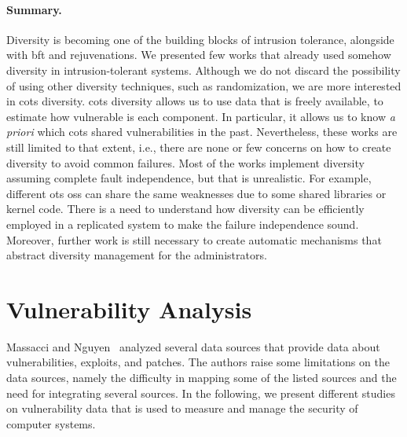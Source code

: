 \paragraph{Summary.} 
Diversity is becoming one of the building blocks of intrusion tolerance, alongside with \gls{bft} and rejuvenations. 
We presented few works that already used somehow diversity in intrusion-tolerant systems. 
Although we do not discard the possibility of using other diversity techniques, such as randomization, we are more interested in \gls{cots} diversity.
\gls{cots} diversity allows us to use data that is freely available, to estimate how vulnerable is each component. 
In particular, it allows us to know \emph{a priori} which \gls{cots} shared vulnerabilities in the past.
Nevertheless, these works are still limited to that extent, i.e., there are none or few concerns on how to create diversity to avoid common failures. 
Most of the works implement diversity assuming complete fault independence, but that is unrealistic. 
For example, different \gls{ots} \glspl{os} can share the same weaknesses due to some shared libraries or kernel code. 
There is a need to understand how diversity can be efficiently employed in a replicated system to make the failure independence sound. 
Moreover, further work is still necessary to create automatic mechanisms that abstract diversity management for the administrators.



\section{Vulnerability Analysis}
Massacci and Nguyen~\cite{Massacci:2010} analyzed several data sources that provide data about vulnerabilities, exploits, and patches. 
The authors raise some limitations on the data sources, namely the difficulty in mapping some of the listed sources and the need for integrating several sources.
In the following, we present different studies on vulnerability data that is used to measure and manage the security of computer systems.


